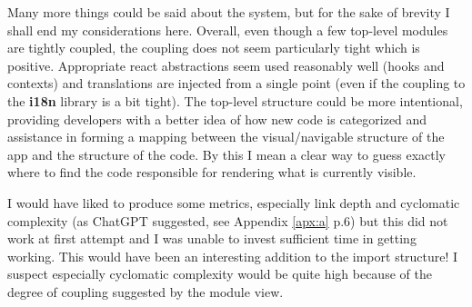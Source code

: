 \documentclass{article}
\begin{document}
\vspace*{1em}
Many more things could be said about the system,
but for the sake of brevity I shall end my considerations here.
Overall,
even though a few top-level modules are tightly coupled,
the coupling does not seem particularly tight which is positive.
Appropriate react abstractions seem used reasonably well (hooks and contexts)
and translations are injected from a single point (even if the coupling to the \textbf{i18n} library is a bit tight).
The top-level structure could be more intentional,
providing developers with a better idea of how new code is categorized 
and assistance in forming a mapping between the visual/navigable structure of the app and the structure of the code.
By this I mean a clear way to guess exactly where to find the code responsible for rendering what is currently visible.










\vspace*{1em}
\noindent
I would have liked to produce some metrics, 
especially link depth and cyclomatic complexity (as ChatGPT suggested, see Appendix \ref{apx:a} p.6) 
but this did not work at first attempt and I was unable to invest sufficient time in getting working.
This would have been an interesting addition to the import structure!
I suspect especially cyclomatic complexity would be quite high 
because of the degree of coupling suggested by the module view.
\end{document}
